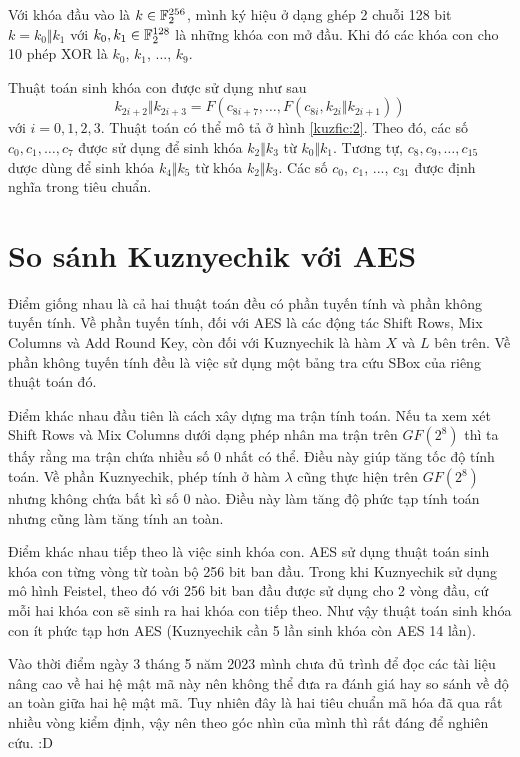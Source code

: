 Với khóa đầu vào là $k \in \mathbb{F}_2^{256}$, mình ký hiệu ở dạng
ghép 2 chuỗi 128 bit $k = k_0 \Vert k_1$ với $k_0, k_1 \in \mathbb{F}_2^{128}$ là
những khóa con mở đầu. Khi đó các khóa con cho 10 phép XOR là $k_0$, 
$k_1$, ..., $k_9$.

Thuật toán sinh khóa con được sử dụng như sau
\begin{equation}
    k_{2i+2} \Vert k_{2i+3} = F(c_{8i+7}, \ldots, F(c_{8i}, k_{2i} \Vert k_{2i+1}))
\end{equation}
với $i=0,1,2,3$. Thuật toán có thể mô tả ở hình \ref{kuzfic:2}. Theo đó,
các số $c_0, c_1, \ldots, c_7$ được sử dụng để sinh khóa $k_2 \Vert k_3$
từ $k_0 \Vert k_1$. Tương tự, $c_8, c_9, \ldots, c_{15}$ dược dùng
để sinh khóa $k_4 \Vert k_5$ từ khóa $k_2 \Vert k_3$. Các số $c_0$, $c_1$,
..., $c_{31}$ được định nghĩa trong tiêu chuẩn.

\section{So sánh Kuznyechik với AES}

Điểm giống nhau là cả hai thuật toán đều có phần tuyến tính và 
phần không tuyến tính. Về phần tuyến tính, đối với AES là các
động tác Shift Rows, Mix Columns và Add Round Key, còn đối với
Kuznyechik là hàm $X$ và $L$ bên trên. Về phần không tuyến tính
đều là việc sử dụng một bảng tra cứu SBox của riêng thuật toán đó.

Điểm khác nhau đầu tiên là cách xây dựng ma trận tính toán. Nếu ta
xem xét Shift Rows và Mix Columns dưới dạng phép nhân ma trận 
trên $GF(2^8)$ thì ta thấy rằng ma trận chứa nhiều số 0 nhất có
thể. Điều này giúp tăng tốc độ tính toán. Về phần Kuznyechik, 
phép tính ở hàm $\lambda$ cũng thực hiện trên $GF(2^8)$ nhưng không
chứa bất kì số 0 nào. Điều này làm tăng độ phức tạp tính toán 
nhưng cũng làm tăng tính an toàn.

Điểm khác nhau tiếp theo là việc sinh khóa con. AES sử dụng thuật toán
sinh khóa con từng vòng từ toàn bộ 256 bit ban đầu. Trong khi Kuznyechik
sử dụng mô hình Feistel, theo đó với 256 bit ban đầu được sử dụng cho
2 vòng đầu, cứ mỗi hai khóa con sẽ sinh ra hai khóa con tiếp theo. Như
vậy thuật toán sinh khóa con ít phức tạp hơn AES (Kuznyechik cần 5 lần
sinh khóa còn AES 14 lần).

Vào thời điểm ngày 3 tháng 5 năm 2023 mình chưa đủ trình để đọc các tài
liệu nâng cao về hai hệ mật mã này nên không thể đưa ra đánh giá hay so
sánh về độ an toàn giữa hai hệ mật mã. Tuy nhiên đây là hai tiêu chuẩn 
mã hóa đã qua rất nhiều vòng kiểm định, vậy nên theo góc nhìn của mình
thì rất đáng để nghiên cứu. :D